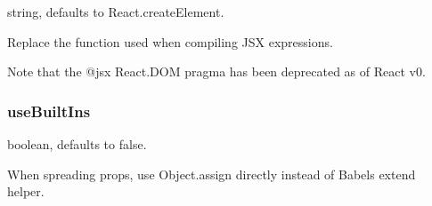 {\ttfamily string}, defaults to {\ttfamily React.\+create\+Element}.

Replace the function used when compiling J\+SX expressions.

Note that the {\ttfamily @jsx React.\+D\+OM} pragma has been deprecated as of React v0.

\subsubsection*{{\ttfamily use\+Built\+Ins}}

{\ttfamily boolean}, defaults to {\ttfamily false}.

When spreading props, use {\ttfamily Object.\+assign} directly instead of Babel\textquotesingle{}s extend helper. 